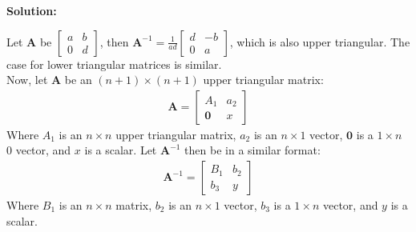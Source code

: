 \documentclass[11pt,letterpaper]{article}
\begin{document}
\begin{enumerate}
\textbf{Solution:}

Let $\mathbf{A}$ be $\begin{bmatrix} a & b \\ 0 & d \end{bmatrix}$, then $\mathbf{A}^{-1} = \frac{1}{ad} \begin{bmatrix} d & -b \\ 0 & a \end{bmatrix}$, which is also upper triangular. The case for lower triangular matrices is similar.\\

Now, let $\mathbf{A}$ be an $(n + 1) \times (n + 1)$ upper triangular matrix:
\begin{gather*}
    \mathbf{A} = \begin{bmatrix} A_{1} & a_2 \\ \mathbf{0} & x \end{bmatrix}
\end{gather*}
Where $A_1$ is an $n \times n$ upper triangular matrix, $a_2$ is an $n \times 1$ 
vector, $\mathbf{0}$ is a $1 \times n$ 0 vector, and $x$ is a scalar. Let 
$\mathbf{A}^{-1}$ then be in a similar format: \\
\begin{gather*}
    \mathbf{A}^{-1} = \begin{bmatrix} B_{1} & b_2 \\ b_3 & y \end{bmatrix}
\end{gather*}
Where $B_1$ is an $n \times n$ matrix, $b_2$ is an $n \times 1$ vector, $b_3$ is 
a $1 \times n$ vector, and $y$ is a scalar.\\


\end{enumerate}
\end{document}
